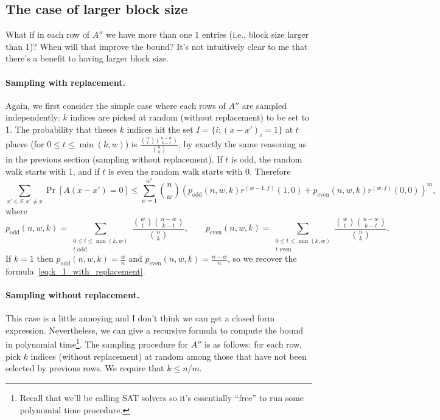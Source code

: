\documentclass[11pt]{article}
\begin{document}
\subsection{The case of larger block size}
\label{subsec:block_size_larger}

What if in each row of $A''$ we have more than one 1 entries (i.e., block size
larger than 1)?
When will that improve the bound?
It's not intuitively clear to me that there's a benefit to having larger block
size.

\paragraph{Sampling with replacement.}
Again, we first consider the simple case where each rows of $A''$ are sampled
independently: $k$ indices are picked at random (without replacement) to be set
to 1.
The probability that theses $k$ indices hit the set $I = \{ i \colon (x - x')_i
= 1 \}$ at $t$ places (for $0 \leq t \leq \min(k, w)$) is $\frac{\binom{w}{t} \binom{n
    - w}{k - t}}{\binom{n}{k}}$, by exactly the same reasoning as in the
previous section (sampling without replacement). 
If $t$ is odd, the random walk starts with 1, and if $t$ is even the random walk
starts with 0.
Therefore
\begin{equation*}
  \sum_{x' \in S, x' \neq x} \Pr[A(x - x') = 0] \leq \sum_{w=1}^{w^*} \binom{n}{w} \left(
    p_\mathrm{odd}(n, w, k) r^{(w-1, f)}(1, 0) + p_\mathrm{even}(n, w, k)
    r^{(w, f)}(0, 0)\right)^m, 
  \label{eq:k_large_with_replacement}
\end{equation*}
where
\begin{equation*}
  p_\mathrm{odd}(n, w, k) = \sum_{\substack{0 \leq t \leq \min(k, w) \\ t \text{ odd}}} \frac{\binom{w}{t}
        \binom{n-w}{k-t}}{\binom{n}{k}}, \qquad
  p_\mathrm{even}(n, w, k) = \sum_{\substack{0 \leq t \leq \min(k, w) \\ t \text{ even}}} \frac{\binom{w}{t}
        \binom{n-w}{k-t}}{\binom{n}{k}}.
\end{equation*}
If $k = 1$ then $p_\mathrm{odd}(n, w, k) = \frac{w}{n}$ and
$p_\mathrm{even}(n, w, k) = \frac{n - w}{n}$, so we recover the formula~\eqref{eq:k_1_with_replacement}.

\paragraph{Sampling without replacement.}
This case is a little annoying and I don't think we can get a closed form
expression.
Nevertheless, we can give a recursive formula to compute the bound in polynomial
time\footnote{Recall that we'll be calling SAT solvers so it's essentially
  ``free'' to run some polynomial time procedure.}.
The sampling procedure for $A''$ is as follows: for each row, pick $k$ indices
(without replacement) at random among those that have not been selected by
previous rows.
We require that $k \leq n / m$.
\end{document}
